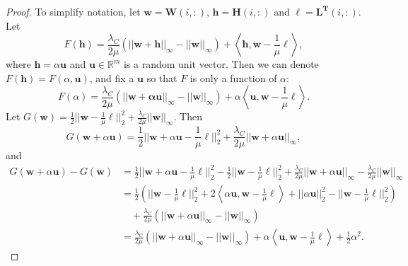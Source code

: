 \documentclass[12pt]{article}
\begin{document}
\begin{proof}
\noindent To simplify notation, let $\mathbf{w} = \mathbf{W}(i,:)$, $\mathbf{h} = \mathbf{H}(i,:)$ and $\boldsymbol\ell = \mathbf{L^T}(i,:)$.  Let
\[
F(\mathbf{h}) = \frac{\lambda_C}{2\mu} (||\mathbf{w+h}||_\infty - ||\mathbf{w}||_\infty) + \left\langle \mathbf{h}, \mathbf{w} - \frac{1}{\mu}\boldsymbol  \ell \right\rangle, 
\]
where $\mathbf{h} = \alpha \mathbf{u}$ and $\mathbf{u} \in \mathbb{R}^{m}$ is a random unit vector.  Then we can denote $F(\mathbf{h}) = F(\alpha, \mathbf{u})$, and fix a $\mathbf{u}$ so that $F$ is only a function of $\alpha$: 
\[
F(\alpha) = \frac{\lambda_C}{2\mu} (||\mathbf{w+\alpha\mathbf{u}}||_\infty - ||\mathbf{w}||_\infty) + \alpha \left\langle \mathbf{u}, \mathbf{w} - \frac{1}{\mu}\boldsymbol \ell \right\rangle. 
\]
Let $G(\mathbf{w}) = \frac{1}{2} ||\mathbf{w} - \frac{1}{\mu} \boldsymbol \ell||^2_2 + \frac{\lambda_C}{2\mu}||\mathbf{w}||_{\infty}$. Then
\[
G(\mathbf{w} + \alpha \mathbf{u}) = \frac{1}{2}||\mathbf{w} + \alpha \mathbf{u} - \frac{1}{\mu} \boldsymbol \ell||^2_2 + \frac{\lambda_C}{2\mu}||\mathbf{w} + \alpha \mathbf{u}||_{\infty},
\]
and
\begin{equation*}
\begin{split}
G(\mathbf{w} + \alpha \mathbf{u}) - G(\mathbf{w}) & = \frac{1}{2}||\mathbf{w} + \alpha \mathbf{u} - \frac{1}{\mu} \boldsymbol \ell||^2_2 - \frac{1}{2}||\mathbf{w} - \frac{1}{\mu} \boldsymbol \ell||^2_2 + \frac{\lambda_C}{2\mu}||\mathbf{w} + \alpha \mathbf{u}||_{\infty} - \frac{\lambda_C}{2\mu}||\mathbf{w}||_{\infty} \\
& = \frac{1}{2} \left( ||\mathbf{w} - \frac{1}{\mu} \boldsymbol \ell||^2_2 + 2 \left\langle \alpha \mathbf{u}, \mathbf{w} - \frac{1}{\mu} \boldsymbol \ell \right\rangle + ||\alpha \mathbf{u}||^2_2 - ||\mathbf{w} - \frac{1}{\mu} \boldsymbol \ell||^2_2 \right) \\ 
& \quad + \frac{\lambda_C}{2\mu}(||\mathbf{w} + \alpha \mathbf{u}||_{\infty} - ||\mathbf{w}||_{\infty}) \\
& = \frac{\lambda_C}{2\mu}(||\mathbf{w} + \alpha \mathbf{u}||_{\infty} - ||\mathbf{w}||_{\infty}) + \alpha \left\langle \mathbf{u}, \mathbf{w} - \frac{1}{\mu} \boldsymbol \ell \right\rangle + \frac{1}{2}\alpha^2.
\end{split}
\end{equation*}


\end{proof}
\end{document}
